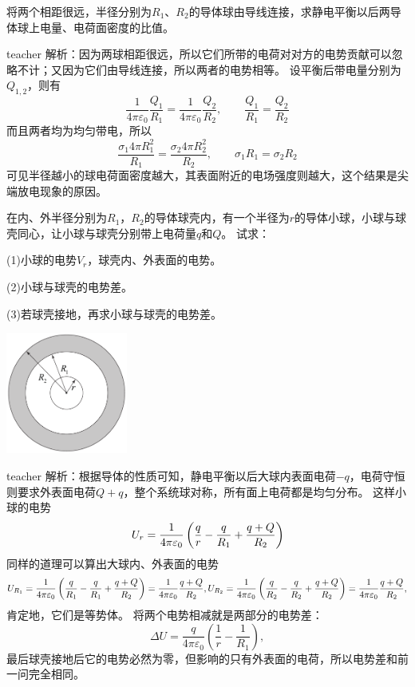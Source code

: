 \begin{example}
将两个相距很远，半径分别为$R_1$、$R_2$的导体球由导线连接，求静电平衡以后两导体球上电量、电荷面密度的比值。
\begin{taggedblock}{teacher}
\newline
解析：因为两球相距很远，所以它们所带的电荷对对方的电势贡献可以忽略不计；又因为它们由导线连接，所以两者的电势相等。
设平衡后带电量分别为$Q_{1,2}$，则有
\[
\frac{1}{4\pi \varepsilon_0}\frac{Q_1}{R_1} = \frac{1}{4\pi \varepsilon_0}\frac{Q_2}{R_2},\qquad  \frac{Q_1}{R_1} = \frac{Q_2}{R_2}
\]
而且两者均为均匀带电，所以
\[
\frac{ \sigma_1 4 \pi R_1^2}{R_1} = \frac{ \sigma_2 4 \pi R_2^2}{R_2},\qquad \sigma_1R_1 = \sigma_2R_2 
\]
可见半径越小的球电荷面密度越大，其表面附近的电场强度则越大，这个结果是尖端放电现象的原因。
\end{taggedblock}
\end{example}

\begin{example}

在内、外半径分别为$R_1$，$R_2$的导体球壳内，有一个半径为$r$的导体小球，小球与球壳同心，让小球与球壳分别带上电荷量$q$和$Q$。
试求：

(1)小球的电势$V_r$，球壳内、外表面的电势。

(2)小球与球壳的电势差。

(3)若球壳接地，再求小球与球壳的电势差。
\begin{flushright}
\includegraphics[width = 0.3\textwidth]{images/elec-problem-13.pdf} 
\end{flushright}
\begin{taggedblock}{teacher}
\noindent
解析：根据导体的性质可知，静电平衡以后大球内表面电荷$-q$，电荷守恒则要求外表面电荷$Q+q$，整个系统球对称，所有面上电荷都是均匀分布。
这样小球的电势
\[
U_r = \frac{1}{4\pi\varepsilon_0} \left(\frac{q}{r}-\frac{q}{R_1}+\frac{q+Q}{R_2}\right)
\]
同样的道理可以算出大球内、外表面的电势
\[
U_{R_1} = \frac{1}{4\pi\varepsilon_0} \left(\frac{q}{R_1}-\frac{q}{R_1}+\frac{q+Q}{R_2}\right) = \frac{1}{4\pi\varepsilon_0}\frac{q+Q}{R_2},U_{R_2} = \frac{1}{4\pi\varepsilon_0} \left(\frac{q}{R_2}-\frac{q}{R_2}+\frac{q+Q}{R_2}\right) = \frac{1}{4\pi\varepsilon_0}\frac{q+Q}{R_2},
\]
肯定地，它们是等势体。
将两个电势相减就是两部分的电势差：
\[
\Delta U = \frac{q}{4\pi\varepsilon_0}\left(\frac{1}{r}-\frac{1}{R_1}\right),
\]
最后球壳接地后它的电势必然为零，但影响的只有外表面的电荷，所以电势差和前一问完全相同。
\end{taggedblock}
\end{example}




